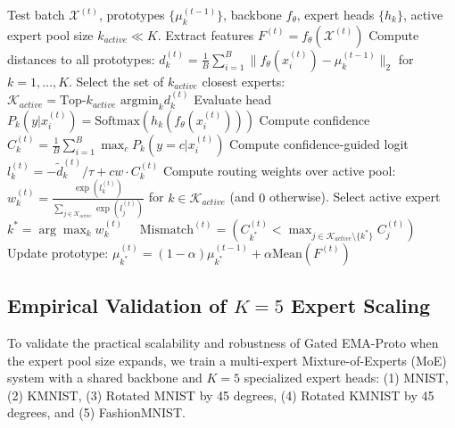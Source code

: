 \documentclass{article}
\theoremstyle{plain}
\theoremstyle{definition}
\theoremstyle{remark}
\begin{document}
\begin{algorithm}[h]
  \caption{Gated EMA-Proto with Localized Expert Pruning}
  \label{alg:localized_pruning}
  \begin{algorithmic}[1]
     Test batch $\mathcal{X}^{(t)}$, prototypes $\{\mu_k^{(t-1)}\}$, backbone $f_\theta$, expert heads $\{h_k\}$, active expert pool size $k_{active} \ll K$.
    \STATE Extract features $F^{(t)} = f_\theta(\mathcal{X}^{(t)})$
    \STATE Compute distances to all prototypes: $d_k^{(t)} = \frac{1}{B} \sum_{i=1}^B \| f_\theta(x_i^{(t)}) - \mu_k^{(t-1)} \|_2$ for $k = 1, \dots, K$.
    \STATE Select the set of $k_{active}$ closest experts: $\mathcal{K}_{active} = \text{Top-}k_{active} \text{ argmin}_k d_k^{(t)}$
    \STATE Evaluate head $P_k(y | x_i^{(t)}) = \text{Softmax}(h_k(f_\theta(x_i^{(t)})))$
    \STATE Compute confidence $C_k^{(t)} = \frac{1}{B} \sum_{i=1}^B \max_c P_k(y=c | x_i^{(t)})$
    \STATE Compute confidence-guided logit $l_k^{(t)} = -\tilde{d}_k^{(t)} / \tau + cw \cdot C_k^{(t)}$
    \ENDFOR
    \STATE Compute routing weights over active pool: $w_k^{(t)} = \frac{\exp(l_k^{(t)})}{\sum_{j \in \mathcal{K}_{active}} \exp(l_j^{(t)})}$ for $k \in \mathcal{K}_{active}$ (and $0$ otherwise).
    \STATE Select active expert $k^* = \arg\max_k w_k^{(t)}$
    \STATE $\quad \text{Mismatch}^{(t)} = (C_{k^*}^{(t)} < \max_{j \in \mathcal{K}_{active} \setminus \{k^*\}} C_j^{(t)})$
    \STATE Update prototype: $\mu_{k^*}^{(t)} = (1-\alpha) \mu_{k^*}^{(t-1)} + \alpha \text{Mean}(F^{(t)})$
    \ENDIF
    \end{algorithmic}
    \end{algorithm}

    \subsection{Empirical Validation of $K=5$ Expert Scaling}
    To validate the practical scalability and robustness of Gated EMA-Proto when the expert pool size expands, we train a multi-expert Mixture-of-Experts (MoE) system with a shared backbone and $K=5$ specialized expert heads: (1) MNIST, (2) KMNIST, (3) Rotated MNIST by 45 degrees, (4) Rotated KMNIST by 45 degrees, and (5) FashionMNIST. 
\end{document}
